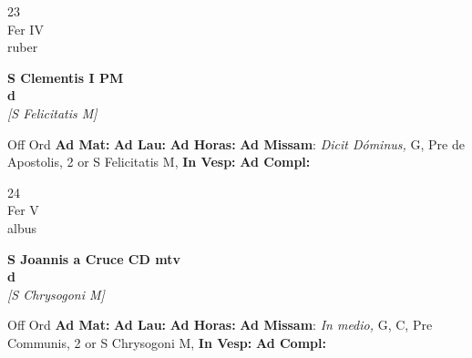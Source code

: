 \documentclass[10pt, openany]{book}
\begin{document}
        \begin{center}
            \begin{minipage}{3.5in}
                \vspace{2em}
                \begin{minipage}{0.5in}
                    {\Huge 23} \\
                    {\normalsize Fer IV} \\
                    {\normalsize ruber}
                \end{minipage}
                \begin{minipage}{3.0in}
                    \textbf{ \large S Clementis I PM \\
                    \textnormal{\normalsize d}} \\ \textit{[S Felicitatis M]} \\ 
                \end{minipage}
                \begin{justify}Off Ord
                    \textbf{Ad Mat: }
                    \textbf{Ad Lau: }
                    \textbf{Ad Horas: }\textbf{Ad Missam}: \textit{Dicit Dóminus,} G, Pre de Apostolis, 2 or S Felicitatis M,  
                    \textbf{In Vesp: }
                    \textbf{Ad Compl: }
                \end{justify}
            \end{minipage}
        \end{center}
    
        \begin{center}
            \begin{minipage}{3.5in}
                \vspace{2em}
                \begin{minipage}{0.5in}
                    {\Huge 24} \\
                    {\normalsize Fer V} \\
                    {\normalsize albus}
                \end{minipage}
                \begin{minipage}{3.0in}
                    \textbf{ \large S Joannis a Cruce CD mtv \\
                    \textnormal{\normalsize d}} \\ \textit{[S Chrysogoni M]} \\ 
                \end{minipage}
                \begin{justify}Off Ord
                    \textbf{Ad Mat: }
                    \textbf{Ad Lau: }
                    \textbf{Ad Horas: }\textbf{Ad Missam}: \textit{In medio,} G, C, Pre Communis, 2 or S Chrysogoni M,  
                    \textbf{In Vesp: }
                    \textbf{Ad Compl: }
                \end{justify}
            \end{minipage}
        \end{center}
    
\end{document}
